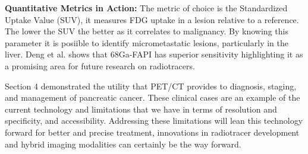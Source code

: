 \begin{multicols}{2}
\textbf{Quantitative Metrics in Action:} The metric of choice is the Standardized Uptake Value (SUV), it measures FDG uptake in a lesion relative to a reference. The lower the SUV the better as it correlates to malignancy. By knowing this parameter it is posiible to identify micrometastatic lesions, particularly in the liver. Deng et al. shows that 68Ga-FAPI has superior sensitivity highlighting it as a promising area for future research on radiotracers.\cite{Deng2021}

Section 4 demonstrated the utility that PET/CT provides to diagnosis, staging, and management of pancreatic cancer. These clinical cases are an example of the current technology and limitations that we have in terms of resolution and specificity, and accessibility. Addressing these limitations will lean this technology forward for better and precise treatment, innovations in radiotracer development and hybrid imaging modalities can certainly be the way forward.

\end{multicols}

